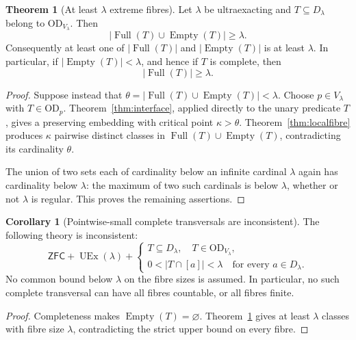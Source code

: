\documentclass[11pt,letterpaper]{article}
\theoremstyle{definition}
\newtheorem{theorem}[definition]{Theorem}
\newtheorem{corollary}[definition]{Corollary}
\numberwithin{equation}{section}
\newcommand{\ZFC}{\mathsf{ZFC}}
\newcommand{\OD}{\mathrm{OD}}
\newcommand{\UEx}{\operatorname{UEx}}
\newcommand{\Full}{\operatorname{Full}}
\newcommand{\Empty}{\operatorname{Empty}}
\begin{document}
\begin{theorem}[At least $\lambda$ extreme fibres]\label{thm:manyfull}
Let $\lambda$ be ultraexacting and $T\subseteq D_\lambda$ belong to $\OD_{V_\lambda}$. Then
\[
 |\Full(T)\cup\Empty(T)|\ge\lambda.
\]
Consequently at least one of $|\Full(T)|$ and $|\Empty(T)|$ is at least $\lambda$. In particular, if $|\Empty(T)|<\lambda$, and hence if $T$ is complete, then
\begin{equation}\label{eq:manyfull}
 |\Full(T)|\ge\lambda.
\end{equation}
\end{theorem}

\begin{proof}
Suppose instead that $\theta=|\Full(T)\cup\Empty(T)|<\lambda$. Choose $p\in V_\lambda$ with $T\in\OD_p$. Theorem~\ref{thm:interface}, applied directly to the unary predicate $T$, gives a preserving embedding with critical point $\kappa>\theta$. Theorem~\ref{thm:localfibre} produces $\kappa$ pairwise distinct classes in $\Full(T)\cup\Empty(T)$, contradicting its cardinality $\theta$.

The union of two sets each of cardinality below an infinite cardinal $\lambda$ again has cardinality below $\lambda$: the maximum of two such cardinals is below $\lambda$, whether or not $\lambda$ is regular. This proves the remaining assertions.
\end{proof}

\begin{corollary}[Pointwise-small complete transversals are inconsistent]\label{cor:thin}
The following theory is inconsistent:
\begin{equation}\label{eq:conditionalinconsistency}
 \ZFC+\UEx(\lambda)+
 \left\{\begin{array}{l}
  T\subseteq D_\lambda,
  \quad T\in\OD_{V_\lambda},\\[-1pt]
  0<|T\cap[a]|<\lambda\quad\text{for every }a\in D_\lambda.
 \end{array}\right.
\end{equation}
No common bound below $\lambda$ on the fibre sizes is assumed. In particular, no such complete transversal can have all fibres countable, or all fibres finite.
\end{corollary}

\begin{proof}
Completeness makes $\Empty(T)=\varnothing$. Theorem~\ref{thm:manyfull} gives at least $\lambda$ classes with fibre size $\lambda$, contradicting the strict upper bound on every fibre.
\end{proof}
\end{document}
